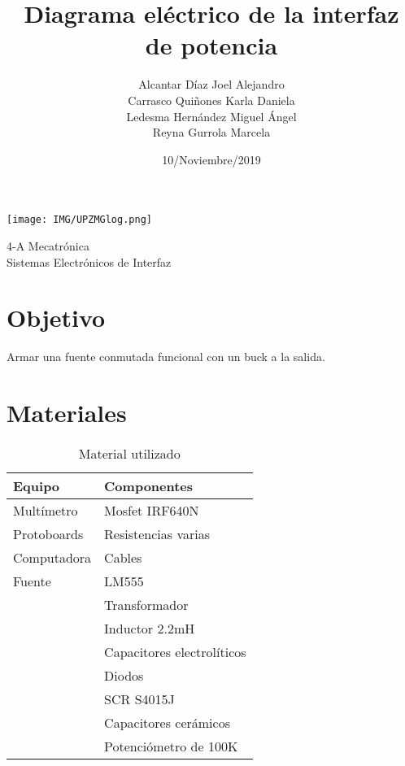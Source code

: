 \documentclass[letterpaper]{article}
\title{Diagrama eléctrico de la interfaz de potencia}
\author{Alcantar Díaz Joel Alejandro\\ Carrasco Quiñones Karla Daniela\\ Ledesma Hernández Miguel Ángel\\  Reyna Gurrola Marcela\\ }
\date{10/Noviembre/2019}
\begin{document}
\maketitle
\vspace{2cm}
\begin{large}
    \begin{center}
        \texttt{[image: IMG/UPZMGlog.png]}
    \end{center}
\end{large}
\vspace{2cm}
\begin{center}
4-A Mecatrónica\\
Sistemas Electrónicos de Interfaz   
\end{center}

\newpage

\section{Objetivo}
\begin{large}
    Armar una fuente conmutada funcional con un buck a la salida.
\end{large}

\section{Materiales}
\begin{table}[hbtp]
    \centering
    \begin{tabular}{|l|l|}
    \hline
       {\color[HTML]{3166FF}\textbf{Equipo}}  &   {\color[HTML]{CB0000}\textbf{Componentes}}\\ \hline
        Multímetro  & Mosfet IRF640N\\ \hline
        Protoboards  & Resistencias varias \\ \hline
        Computadora & Cables \\ \hline
        Fuente      & LM555   \\ \hline
                    & Transformador    \\ \hline
                    & Inductor 2.2mH   \\ \hline
                    & Capacitores electrolíticos\\\hline
                    & Diodos\\\hline
                    & SCR S4015J\\\hline
                    & Capacitores cerámicos\\\hline
                    & Potenciómetro de 100K \\\hline
    \end{tabular}
    \caption{Material utilizado}
    \label{tab:materiales}
\end{table}
\end{document}
